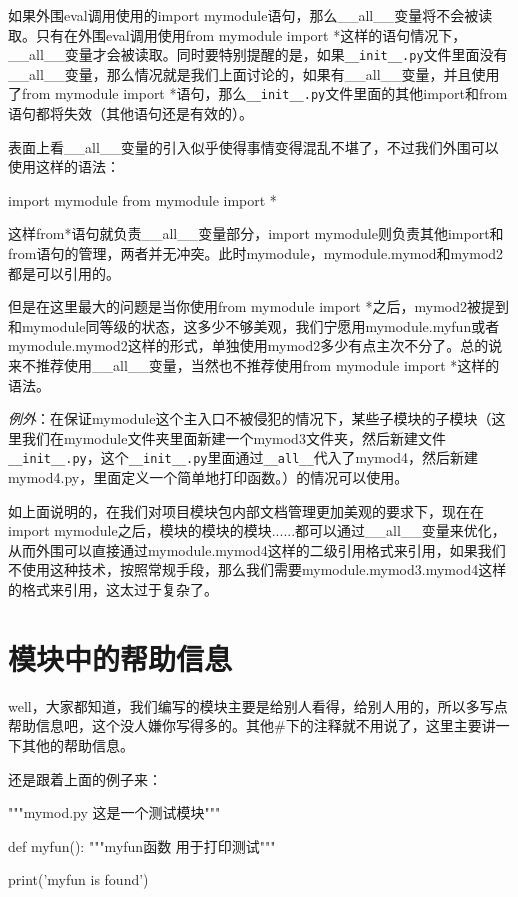 \documentclass[12pt,oneside]{book}
\begin{document}
\begin{common-format}
如果外围eval调用使用的import mymodule语句，那么\_{}\_{}all\_{}\_{}变量将不会被读取。只有在外围eval调用使用from mymodule import *这样的语句情况下，\_{}\_{}all\_{}\_{}变量才会被读取。同时要特别提醒的是，如果\verb+__init__.py+文件里面没有\_{}\_{}all\_{}\_{}变量，那么情况就是我们上面讨论的，如果有\_{}\_{}all\_{}\_{}变量，并且使用了from mymodule import *语句，那么\verb+__init__.py+文件里面的其他import和from语句都将失效（其他语句还是有效的）。

表面上看\_{}\_{}all\_{}\_{}变量的引入似乎使得事情变得混乱不堪了，不过我们外围可以使用这样的语法：
\begin{tcbpython}[]
import mymodule
from mymodule import *
\end{tcbpython}
这样from*语句就负责\_{}\_{}all\_{}\_{}变量部分，import mymodule则负责其他import和from语句的管理，两者并无冲突。此时mymodule，mymodule.mymod和mymod2都是可以引用的。

但是在这里最大的问题是当你使用from mymodule import *之后，mymod2被提到和mymodule同等级的状态，这多少不够美观，我们宁愿用mymodule.myfun或者mymodule.mymod2这样的形式，单独使用mymod2多少有点主次不分了。总的说来不推荐使用\_{}\_{}all\_{}\_{}变量，当然也不推荐使用from mymodule import *这样的语法。

\emph{例外}：在保证mymodule这个主入口不被侵犯的情况下，某些子模块的子模块（这里我们在mymodule文件夹里面新建一个mymod3文件夹，然后新建文件\verb+__init__.py+，这个\verb+__init__.py+里面通过\verb+__all__+代入了mymod4，然后新建mymod4.py，里面定义一个简单地打印函数。）的情况可以使用。

如上面说明的，在我们对项目模块包内部文档管理更加美观的要求下，现在在import mymodule之后，模块的模块的模块......都可以通过\_{}\_{}all\_{}\_{}变量来优化，从而外围可以直接通过mymodule.mymod4这样的二级引用格式来引用，如果我们不使用这种技术，按照常规手段，那么我们需要mymodule.mymod3.mymod4这样的格式来引用，这太过于复杂了。


\section{模块中的帮助信息}
well，大家都知道，我们编写的模块主要是给别人看得，给别人用的，所以多写点帮助信息吧，这个没人嫌你写得多的。其他\#{}下的注释就不用说了，这里主要讲一下其他的帮助信息。

还是跟着上面的例子来：
\begin{tcbpython}
"""mymod.py
这是一个测试模块"""

def myfun():
    """myfun函数
    用于打印测试"""

    print('myfun is found')
\end{tcbpython}


\end{common-format}
\end{document}
